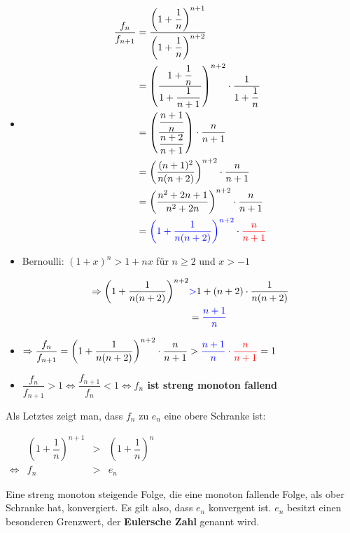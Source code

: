 \documentclass[main.tex]{subfiles}
\begin{document}
\begin{itemize}
	\item \begin{align*}
		\dfrac{f_{n}}{f_{n+1}}&=\dfrac{\left(1+\dfrac{1}{n}\right)^{n+1}}{\left(1+\dfrac{1}{n}\right)^{n+2}} \\
		& = \left(\dfrac{1+\dfrac{1}{n}}{1+\dfrac{1}{n+1}}\right)^{n+2}\cdot\dfrac{1}{1+\dfrac{1}{n}} \\
		& = \left(\dfrac{\dfrac{n+1}{n}}{\dfrac{n+2}{n+1}}\right)\cdot\dfrac{n}{n+1} \\
		& = \left(\dfrac{(n+1)^2}{n(n+2)}\right)^{n+2}\cdot\dfrac{n}{n+1} \\
		& = \left(\dfrac{n^2+2n+1}{n^2+2n}\right)^{n+2}\cdot\dfrac{n}{n+1} \\
		& = \textcolor{blue}{\left(1+\dfrac{1}{n(n+2)}\right)^{n+2}}\cdot\textcolor{red}{\dfrac{n}{n+1}}
	\end{align*}

	\item Bernoulli: $(1+x)^n>1+nx$ für $n\geq2$ und $x>-1$
	
		\begin{align*}
			\Rightarrow\left(1+\dfrac{1}{n(n+2)}\right)^{n+2}&\textcolor{blue}{>}1+(n+2)\cdot\dfrac{1}{n(n+2)} \\
			& = \textcolor{blue}{\dfrac{n+1}{n}}
		\end{align*}

	\item $\Rightarrow\dfrac{f_n}{f_{n+1}}=\left(1+\dfrac{1}{n(n+2)}\right)^{n+2}\cdot\dfrac{n}{n+1}>\textcolor{blue}{\dfrac{n+1}{n}}\cdot\textcolor{red}{\dfrac{n}{n+1}}=1$
	\item $\dfrac{f_n}{f_{n+1}}>1\Leftrightarrow\dfrac{f_{n+1}}{f_{n}}<1$\textbf{$\Leftrightarrow f_n$ ist streng monoton fallend}
\end{itemize}

Als Letztes zeigt man, dass $f_n$ zu $e_n$ eine obere Schranke ist:

$\begin{array}{rccc}
	& \left(1+\dfrac{1}{n}\right)^{n+1} & > & \left(1+\dfrac{1}{n}\right)^n \\
	\Leftrightarrow & f_n & > & e_n
\end{array}$

Eine streng monoton steigende Folge, die eine monoton fallende Folge, als ober Schranke hat, konvergiert. Es gilt also, dass $e_n$ konvergent ist. $e_n$ besitzt einen besonderen Grenzwert, der \textbf{Eulersche Zahl} genannt wird.
\newpage
\end{document}
